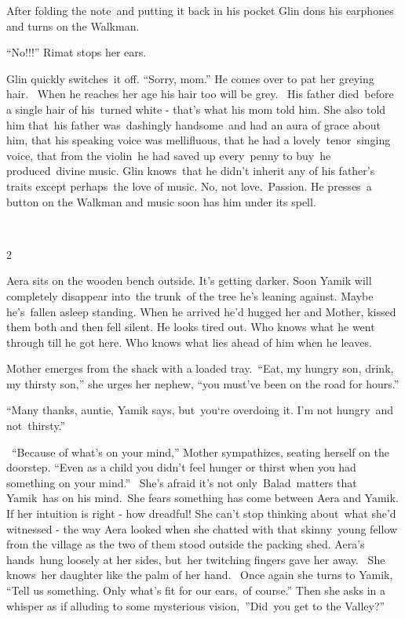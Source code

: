 \documentclass[twoside,11pt]{book}
\begin{document}
{After folding the
}note{\ }{and putting it back
in his pocket Glin dons his earphones and turns on the Walkman. }

{{}``No!!!'' Rimat stops her ears. }

{Glin }quickly
switches\ {it off. ``Sorry, mom.'' }He comes over to pat her greying
hair.~ When he reaches her age his hair too will be grey.~ His father died~before a single hair of his\ turned white -
that's what his mom told him.  She also told him that{\ }his father was\ dashingly handsome\ and had an
aura of grace about him, that his speaking voice was mellifluous, that he had a lovely\ tenor\ singing voice, that from
the violin~he had saved up every\ penny to buy\ he produced\ divine music. Glin knows~that
{he didn{}'t inherit any of his father's traits except perhaps\ the
love of music. No, not love.~Passion. He }presses\ {a button on the
Walkman and }music soon has him under its spell.~ 

{~}

{2}

{Aera sits on the wooden bench
out}side{. }It's getting darker.
Soon{ Yamik will completely disappear into~the trunk~of the tree he's
leaning against. Maybe he{}'s\ fallen asleep standing. When he }arrived he{}'d hugged her and Mother, kissed them both
and then fell silent. He looks tired out. Who knows what he went through till he got here. Who knows what lies ahead of
him when he leaves.\ 

Mother emerges from the shack with a loaded tray.\ {{}``Eat, my hungry
son, drink, my thirsty son,'' she urges her
}{nephew}{, ``you must've been on the road for
hours.''}

{{}``Many thanks, auntie,{\textquotedbl} Yamik says,
{\textquotedbl}but\ you`re overdoing it. I'm not hungry\ }and
not\ {thirsty.''}

\ {}``Because of what's on your mind,'' Mother sympathizes, seating herself on the doorstep. ``Even as a child you
didn't feel hunger or thirst when you had something on your mind.''~ She{}'s afraid it{}'s not only~Balad\ matters that
Yamik\ has on his mind.\ She fears something has come between Aera and Yamik. If her intuition is right - how dreadful!
She can{}'t stop thinking about\ what she{}'d witnessed - the way Aera looked when she chatted with that
skinny{\ }young fellow from the village as the two of them stood outside the packing shed. Aera's
hands~hung loosely at her sides, but\ her twitching fingers gave her away.~ She knows~her daughter like the palm of her
hand.~ Once again she turns to Yamik, ``Tell us something. Only what's fit for our ears,\ of course.{}'' Then she asks
in a whisper as if alluding to some mysterious vision,\ {}''Did{\ }you get to the Valley?'' 
\end{document}
